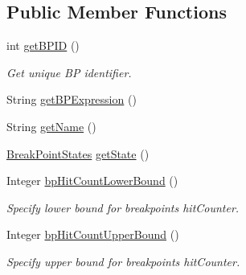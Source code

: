 \subsection*{Public Member Functions}
\begin{DoxyCompactItemize}
\item 
int \hyperlink{interfacegov_1_1nasa_1_1jpf_1_1inspector_1_1interfaces_1_1_break_point_creation_information_a261d8c7de48f0776fbe0b4222c568070}{get\+B\+P\+ID} ()
\begin{DoxyCompactList}\small\item\em Get unique BP identifier. \end{DoxyCompactList}\item 
String \hyperlink{interfacegov_1_1nasa_1_1jpf_1_1inspector_1_1interfaces_1_1_break_point_creation_information_aa7da9b019da9ee304abd59759f73d14e}{get\+B\+P\+Expression} ()
\item 
String \hyperlink{interfacegov_1_1nasa_1_1jpf_1_1inspector_1_1interfaces_1_1_break_point_creation_information_a3417b55955320c81f68b2f2dc5eef7d9}{get\+Name} ()
\item 
\hyperlink{enumgov_1_1nasa_1_1jpf_1_1inspector_1_1interfaces_1_1_break_point_states}{Break\+Point\+States} \hyperlink{interfacegov_1_1nasa_1_1jpf_1_1inspector_1_1interfaces_1_1_break_point_creation_information_af471d172e5a442597709b20afe3d28e4}{get\+State} ()
\item 
Integer \hyperlink{interfacegov_1_1nasa_1_1jpf_1_1inspector_1_1interfaces_1_1_break_point_creation_information_a0732dfa7c7e94e3e28e7348a0594702b}{bp\+Hit\+Count\+Lower\+Bound} ()
\begin{DoxyCompactList}\small\item\em Specify lower bound for breakpoint\textquotesingle{}s hit\+Counter. \end{DoxyCompactList}\item 
Integer \hyperlink{interfacegov_1_1nasa_1_1jpf_1_1inspector_1_1interfaces_1_1_break_point_creation_information_a62389a60ba0878868c893d0a3d2efe56}{bp\+Hit\+Count\+Upper\+Bound} ()
\begin{DoxyCompactList}\small\item\em Specify upper bound for breakpoint\textquotesingle{}s hit\+Counter. \end{DoxyCompactList}\end{DoxyCompactItemize}

